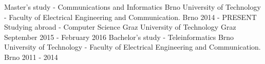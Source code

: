 

\begin{cventries}

  \cventry
    {Master's study - Communications and Informatics}
    {Brno University of Technology - Faculty of Electrical Engineering and Communication.}
    {Brno}
    {2014 - PRESENT}
    {}
  \cventry
    {Studying abroad - Computer Science}
    {Graz University of Technology}
    {Graz}
    {September 2015 - February 2016}
    {}
  \cventry
    {Bachelor's study - Teleinformatics} %
    {Brno University of Technology - Faculty of Electrical Engineering and Communication.} %
    {Brno} %
    {2011 - 2014} %
    {}

\end{cventries}